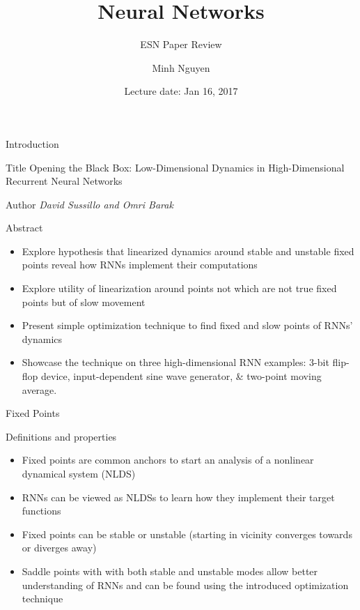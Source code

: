 \documentclass[9pt]{beamer}
\title{Neural Networks}
\subtitle{ESN Paper Review}
\date{Lecture date: Jan 16, 2017}
\author{Minh Nguyen}
\begin{document}
\maketitle

\begin{frame}{Introduction}
    \begin{alertblock}{Title}
        Opening the Black Box: Low-Dimensional Dynamics in High-Dimensional Recurrent Neural Networks
    \end{alertblock}
    \begin{alertblock}{Author}
        \emph{David Sussillo and Omri Barak}
    \end{alertblock}
    \begin{alertblock}{Abstract}
        \begin{itemize}
            \item Explore hypothesis that linearized dynamics around stable and unstable fixed points reveal how RNNs implement their computations
            \item Explore utility of linearization around points not which are not true fixed points but of slow movement
            \item Present simple optimization technique to find fixed and slow points of RNNs' dynamics
            \item Showcase the technique on three high-dimensional RNN examples: 3-bit flip-flop device, input-dependent sine wave generator, \& two-point moving average.
        \end{itemize}
    \end{alertblock}
\end{frame}

\begin{frame}{Fixed Points}
    \begin{alertblock}{Definitions and properties}
        \begin{itemize}
            \item Fixed points are common anchors to start an analysis of a nonlinear dynamical system (NLDS)
            \item RNNs can be viewed as NLDSs to learn how they implement their target functions
            \item Fixed points can be stable or unstable (starting in vicinity converges towards or diverges away)
            \item Saddle points with with both stable and unstable modes allow better understanding of RNNs and can be found using the introduced optimization technique
        \end{itemize}
    \end{alertblock}
\end{frame}
\end{document}
